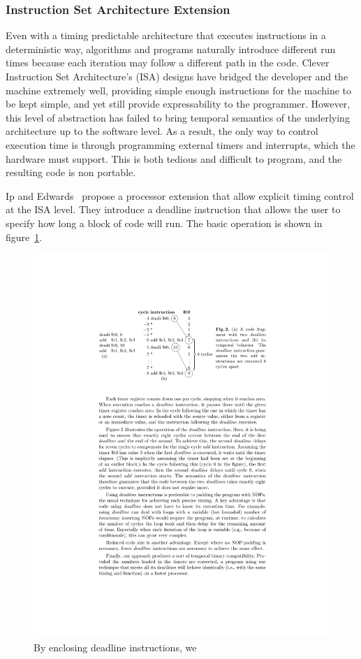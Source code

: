 \documentclass[times, 10pt,twocolumn]{article}
\begin{document}
\subsubsection {Instruction Set Architecture Extension}
Even with a timing predictable architecture that executes instructions in a deterministic way, algorithms and programs naturally introduce different run times because each iteration may follow a different path in the code. Clever Instruction Set Architecture's (ISA) designs have bridged the developer and the machine extremely well, providing simple enough instructions for the machine to be kept simple, and yet still provide expressability to the programmer. However, this level of abstraction has failed to bring temporal semantics of the underlying architecture up to the software level. As a result, the only way to control execution time is through programming external timers and interrupts, which the hardware must support. This is both tedious and difficult to program, and the resulting code is non portable. 

Ip and Edwards~\cite{ip2006processor} propose a processor extension that allow explicit timing control at the ISA level. They introduce a deadline instruction that allows the user to specify how long a block of code will run. The basic operation is shown in figure~\ref{fig:deadline}.

\begin{figure}
  \centering
  \includegraphics[scale=.85]{./images/deadlineExp.pdf}
  \caption{By enclosing deadline instructions, we }
  \label{fig:deadline}
\end{figure}
\end{document}
